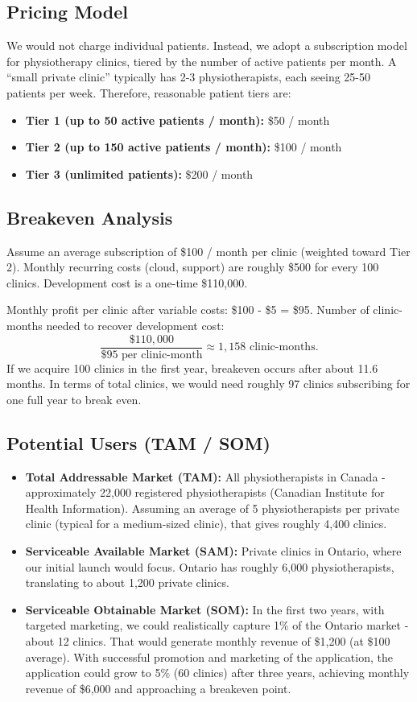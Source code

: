 \documentclass{article}
\begin{document}
\subsection*{Pricing Model}
We would not charge individual patients. Instead, we adopt a subscription model for physiotherapy clinics, tiered by the number of active patients per month. A “small private clinic” typically has 2-3 physiotherapists, each seeing 25-50 patients per week. Therefore, reasonable patient tiers are:
\begin{itemize}
    \item \textbf{Tier 1 (up to 50 active patients / month):} \$50 / month 
    \item \textbf{Tier 2 (up to 150 active patients / month):} \$100 / month
    \item \textbf{Tier 3 (unlimited patients):} \$200 / month 
\end{itemize}

\subsection*{Breakeven Analysis}
Assume an average subscription of \$100 / month per clinic (weighted toward Tier 2). Monthly recurring costs (cloud, support) are roughly \$500 for every 100 clinics. Development cost is a one-time \$110,000.

Monthly profit per clinic after variable costs: \$100 - \$5 = \$95.  
Number of clinic-months needed to recover development cost:  
\[
\frac{\$110,000}{\$95 \text{ per clinic-month}} \approx 1,158 \text{ clinic-months}.
\]  
If we acquire 100 clinics in the first year, breakeven occurs after about 11.6 months. In terms of total clinics, we would need roughly 97 clinics subscribing for one full year to break even.

\subsection*{Potential Users (TAM / SOM)}
\begin{itemize}
    \item \textbf{Total Addressable Market (TAM):} All physiotherapists in Canada - approximately 22,000 registered physiotherapists (Canadian Institute for Health Information). Assuming an average of 5 physiotherapists per private clinic (typical for a medium-sized clinic), that gives roughly 4,400 clinics.
    \item \textbf{Serviceable Available Market (SAM):} Private clinics in Ontario, where our initial launch would focus. Ontario has roughly 6,000 physiotherapists, translating to about 1,200 private clinics.
    \item \textbf{Serviceable Obtainable Market (SOM):} In the first two years, with targeted marketing, we could realistically capture 1\% of the Ontario market - about 12 clinics. That would generate monthly revenue of \$1,200 (at \$100 average). With successful promotion and marketing of the application, the application could grow to 5\% (60 clinics) after three years, achieving monthly revenue of \$6,000 and approaching a breakeven point.
\end{itemize}
\end{document}
